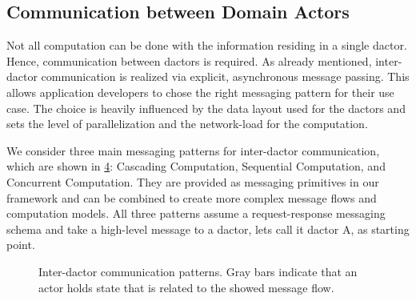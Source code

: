   \subsection{Communication between Domain Actors}\label{sec:dactor_comm}
    Not all computation can be done with the information residing in a single \gls{dactor}.
    Hence, communication between \glspl{dactor} is required.
    As already mentioned, inter-\gls{dactor} communication is realized via explicit, asynchronous message passing.
    This allows application developers to chose the right messaging pattern for their use case.
    The choice is heavily influenced by the data layout used for the \glspl{dactor} and sets the level of parallelization and the network-load for the computation.

    We consider three main messaging patterns for inter-\gls{dactor} communication, which are shown in \cref{fig:comp_patterns}: Cascading Computation, Sequential Computation, and Concurrent Computation.
    They are provided as messaging primitives in our framework and can be combined to create more complex message flows and computation models.
    All three patterns assume a request-response messaging schema and take a high-level message to a \gls{dactor}, lets call it \gls{dactor} A, as starting point.

    \begin{figure}
      \centering

      \begin{subfigure}[t]{0.32\textwidth}
        \centering
        
        \label{fig:comp_pattern_1}
      \end{subfigure}\hfill
      \begin{subfigure}[t]{0.32\textwidth}
        \centering
        
        \label{fig:comp_pattern_2}
      \end{subfigure}\hfill
      \begin{subfigure}[t]{0.32\textwidth}
        \centering
        
        \label{fig:comp_pattern_3}
      \end{subfigure}
      \caption{Inter-\gls{dactor} communication patterns. Gray bars indicate that an actor holds state that is related to the showed message flow.}
      \label{fig:comp_patterns}
    \end{figure}

